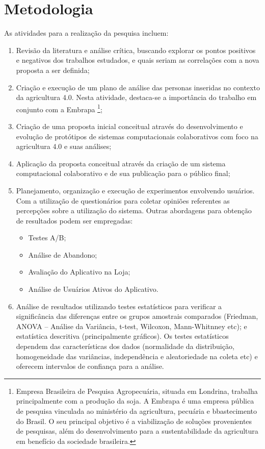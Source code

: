 \documentclass[12pt]{article}
\begin{document}
\section{Metodologia}
\label{sec:metodologia}

As atividades para a realização da pesquisa incluem:

\begin{enumerate}
	\item Revisão da literatura e análise crítica, buscando explorar os pontos positivos e negativos dos trabalhos estudados, e quais seriam as correlações com a nova proposta a ser definida;
	\item Criação e execução de um plano de análise das personas inseridas no contexto da agricultura 4.0. Nesta atividade, destaca-se a importância do trabalho em conjunto com a Embrapa \footnote{Empresa Brasileira de Pesquisa Agropecuária, situada em Londrina, trabalha principalmente com a produção da soja. A Embrapa é uma empresa pública de pesquisa vinculada ao ministério da agricultura, pecuária e bbastecimento do Brasil. O seu principal objetivo é a viabilização de soluções provenientes de pesquisas, além do desenvolvimento para a sustentabilidade da agricultura em benefício da sociedade brasileira.};
	\item Criação de uma proposta inicial conceitual através do desenvolvimento e evolução de protótipos de sistemas computacionais colaborativos com foco na agricultura 4.0 e suas análises;
	\item Aplicação da proposta conceitual através da criação de um sistema computacional colaborativo e de sua publicação para o público final;
	\item Planejamento, organização e execução de experimentos envolvendo usuários. Com a utilização de questionários para coletar opiniões referentes as percepções sobre a utilização do sistema. Outras abordagens para obtenção de resultados podem ser empregadas:
	\begin{itemize}
		\item Testes A/B;
		\item Análise de Abandono;
		\item Avaliação do Aplicativo na Loja;
		\item Análise de Usuários Ativos do Aplicativo.
	\end{itemize}
	\item Análise de resultados utilizando testes estatísticos para verificar a significância das diferenças entre os grupos amostrais comparados (Friedman, ANOVA – Análise da Variância, t-test, Wilcoxon, Mann-Whitnney etc); e estatística descritiva (principalmente gráficos). Os testes estatísticos dependem das características dos dados (normalidade da distribuição, homogeneidade das variâncias, independência e aleatoriedade na coleta etc) e oferecem intervalos de confiança para a análise.
\end{enumerate}
\end{document}
